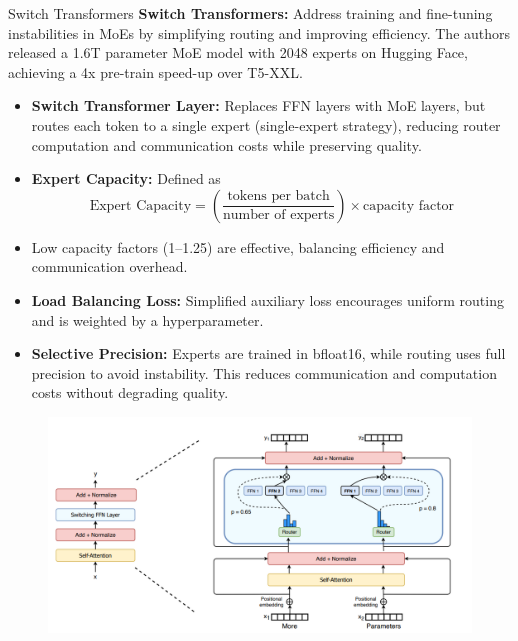 \begin{frame}[allowframebreaks]{Switch Transformers}
    \textbf{Switch Transformers:} Address training and fine-tuning instabilities in MoEs by simplifying routing and improving efficiency. The authors released a 1.6T parameter MoE model with 2048 experts on Hugging Face, achieving a 4x pre-train speed-up over T5-XXL.

    \begin{itemize}
        \item \textbf{Switch Transformer Layer:} Replaces FFN layers with MoE layers, but routes each token to a single expert (single-expert strategy), reducing router computation and communication costs while preserving quality.
        \item \textbf{Expert Capacity:} Defined as
        \[
            \text{Expert Capacity} = \left(\frac{\text{tokens per batch}}{\text{number of experts}}\right) \times \text{capacity factor}
        \]
        \item Low capacity factors (1--1.25) are effective, balancing efficiency and communication overhead.
        \item \textbf{Load Balancing Loss:} Simplified auxiliary loss encourages uniform routing and is weighted by a hyperparameter.
        \item \textbf{Selective Precision:} Experts are trained in bfloat16, while routing uses full precision to avoid instability. This reduces communication and computation costs without degrading quality.
    \end{itemize}

\framebreak

    \begin{figure}
        \centering
        \includegraphics[height=0.9\textheight,width=1\textwidth,keepaspectratio]{images/recent-advance/moe-switch-trans.png}
    \end{figure}


\end{frame}
